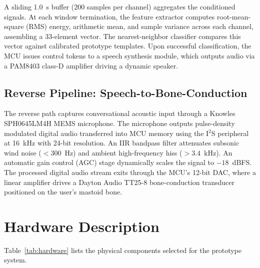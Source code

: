 \documentclass[conference]{IEEEtran}
\begin{document}
A sliding 1.0~s buffer (200 samples per channel) aggregates the conditioned signals. At each window termination, the feature extractor computes root-mean-square (RMS) energy, arithmetic mean, and sample variance across each channel, assembling a 33-element vector. The nearest-neighbor classifier compares this vector against calibrated prototype templates. Upon successful classification, the MCU issues control tokens to a speech synthesis module, which outputs audio via a PAM8403 class-D amplifier driving a dynamic speaker.

\subsection{Reverse Pipeline: Speech-to-Bone-Conduction}
The reverse path captures conversational acoustic input through a Knowles SPH0645LM4H MEMS microphone. The microphone outputs pulse-density modulated digital audio transferred into MCU memory using the I$^2$S peripheral at 16~kHz with 24-bit resolution. An IIR bandpass filter attenuates subsonic wind noise ($<300$~Hz) and ambient high-frequency hiss ($>3.4$~kHz). An automatic gain control (AGC) stage dynamically scales the signal to $-18$~dBFS. The processed digital audio stream exits through the MCU's 12-bit DAC, where a linear amplifier drives a Dayton Audio TT25-8 bone-conduction transducer positioned on the user's mastoid bone.

\section{Hardware Description}
\label{sec:hardware}

Table~\ref{tab:hardware} lists the physical components selected for the prototype system.
\end{document}

